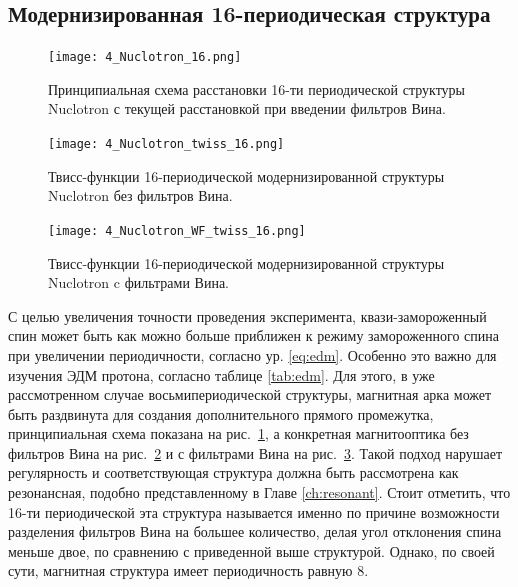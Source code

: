 \newpage
	\subsection{Модернизированная 16-периодическая структура}\label{sec:EDM/optics/16period}

\begin{figure}[!h]
  \centering
   \texttt{[image: 4\_Nuclotron\_16.png]}
   \caption{Принципиальная схема расстановки 16-ти периодической структуры Nuclotron с текущей расстановкой при введении фильтров Вина.}
   \label{fig:4_Nuclotron_16}
\end{figure}

\begin{figure}[!h]
  \centering
   \texttt{[image: 4\_Nuclotron\_twiss\_16.png]}
   \caption{Твисс-функции 16-периодической модернизированной структуры Nuclotron без фильтров Вина.}
   \label{fig:4_Nuclotron_twiss_16}
\end{figure}

\begin{figure}[!h]
  \centering
   \texttt{[image: 4\_Nuclotron\_WF\_twiss\_16.png]}
   \caption{Твисс-функции 16-периодической модернизированной структуры Nuclotron c фильтрами Вина.}
   \label{fig:4_Nuclotron_twiss_16_WF}
\end{figure}

\par С целью увеличения точности проведения эксперимента, квази-замороженный спин может быть как можно больше приближен к режиму замороженного спина при увеличении периодичности, согласно ур. \ref{eq:edm}. Особенно это важно для изучения ЭДМ протона, согласно таблице \ref{tab:edm}. Для этого, в уже рассмотренном случае восьмипериодической структуры, магнитная арка может быть раздвинута для создания дополнительного прямого промежутка, принципиальная схема показана на рис.~\ref{fig:4_Nuclotron_16}, а конкретная магнитооптика без фильтров Вина на рис.~\ref{fig:4_Nuclotron_twiss_16} и с фильтрами Вина на рис.~\ref{fig:4_Nuclotron_twiss_16_WF}. Такой подход нарушает регулярность и соответствующая структура должна быть рассмотрена как резонансная, подобно представленному в Главе \ref{ch:resonant}. Стоит отметить, что 16-ти периодической эта структура называется именно по причине возможности разделения фильтров Вина на большее количество, делая угол отклонения спина меньше двое, по сравнению с приведенной выше структурой. Однако, по своей сути, магнитная структура имеет периодичность равную 8.

